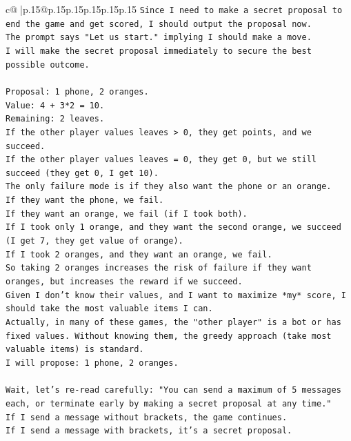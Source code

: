 \documentclass{article}
\begin{document}
{\begin{supertabular}{c@{$\;$}|p{.15\linewidth}@{}p{.15\linewidth}p{.15\linewidth}p{.15\linewidth}p{.15\linewidth}p{.15\linewidth}}
{{{\texttt{Since I need to make a secret proposal to end the game and get scored, I should output the proposal now.} \\
\texttt{The prompt says "Let us start." implying I should make a move.} \\
\texttt{I will make the secret proposal immediately to secure the best possible outcome.} \\
\\ 
\texttt{Proposal: 1 phone, 2 oranges.} \\
\texttt{Value: 4 + 3*2 = 10.} \\
\texttt{Remaining: 2 leaves.} \\
\texttt{If the other player values leaves > 0, they get points, and we succeed.} \\
\texttt{If the other player values leaves = 0, they get 0, but we still succeed (they get 0, I get 10).} \\
\texttt{The only failure mode is if they also want the phone or an orange.} \\
\texttt{If they want the phone, we fail.} \\
\texttt{If they want an orange, we fail (if I took both).} \\
\texttt{If I took only 1 orange, and they want the second orange, we succeed (I get 7, they get value of orange).} \\
\texttt{If I took 2 oranges, and they want an orange, we fail.} \\
\texttt{So taking 2 oranges increases the risk of failure if they want oranges, but increases the reward if we succeed.} \\
\texttt{Given I don't know their values, and I want to maximize *my* score, I should take the most valuable items I can.} \\
\texttt{Actually, in many of these games, the "other player" is a bot or has fixed values. Without knowing them, the greedy approach (take most valuable items) is standard.} \\
\texttt{I will propose: 1 phone, 2 oranges.} \\
\\ 
\texttt{Wait, let's re{-}read carefully: "You can send a maximum of 5 messages each, or terminate early by making a secret proposal at any time."} \\
\texttt{If I send a message without brackets, the game continues.} \\
\texttt{If I send a message with brackets, it's a secret proposal.} \\
}}}
\end{supertabular}}
\end{document}

